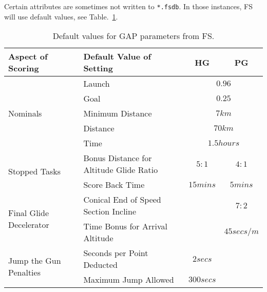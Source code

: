 \documentclass[gap.tex]{subfiles}
\begin{document}
Certain attributes are sometimes not written to \texttt{*.fsdb}. In those
instances, FS will use default values, see Table.~\ref{tab:gap-defaults}.

\begin{table}[!ht]
    \begin{tabularx}{\textwidth}{|l|X|c|c|}
    \hline
        \textbf{Aspect of Scoring}
        & \textbf{Default Value of Setting}
        & \textbf{HG}
        & \textbf{PG}
        \\
    \hline
        \multirow{5}{*}{Nominals}
        & Launch
        & \multicolumn{2}{c|}{$0.96$}
        \\
    \cline{2-4}
        & Goal
        & \multicolumn{2}{c|}{$0.25$}
        \\
    \cline{2-4}
        & Minimum Distance
        & \multicolumn{2}{c|}{$7 km$}
        \\
    \cline{2-4}
        & Distance
        & \multicolumn{2}{c|}{$70 km$}
        \\
    \cline{2-4}
        & Time
        & \multicolumn{2}{c|}{$1.5 hours$}
        \\
    \hline
        \multirow{2}{*}{Stopped Tasks}
        & Bonus Distance for Altitude Glide Ratio
        & $5:1$
        & $4:1$
        \\
    \cline{2-4}
        & Score Back Time
        & $15 mins$
        & $5 mins$
        \\
    \hline
        \multirow{2}{*}{Final Glide Decelerator}
        & Conical End of Speed Section Incline
        &
        & $7:2$
        \\
    \cline{2-4}
        & Time Bonus for Arrival Altitude
        &
        & $45 secs / m$
        \\
    \hline
        \multirow{2}{*}{Jump the Gun Penalties}
        & Seconds per Point Deducted
        & $2 secs$
        &
        \\
    \cline{2-4}
        & Maximum Jump Allowed
        & $300 secs$
        &
        \\
    \hline
    \end{tabularx}
    \caption{Default values for GAP parameters from FS.}
    \label{tab:gap-defaults}
\end{table}
\end{document}
